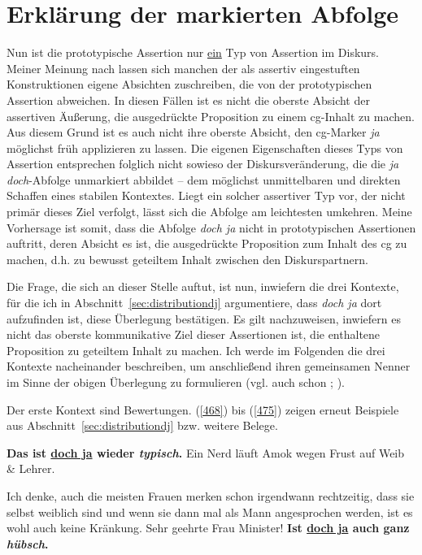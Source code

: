 \section{Erklärung der markierten Abfolge}
\label{sec:markiert} 
Nun ist die prototypische Assertion nur \underline{ein} Typ von Assertion im Diskurs. Meiner Meinung nach lassen sich manchen der als assertiv eingestuften Konstruktionen eigene Absichten zuschreiben, die von der prototypischen Assertion abweichen. In diesen Fällen ist es nicht die oberste Absicht der assertiven Äußerung, die ausgedrückte Proposition zu einem cg-Inhalt zu machen. Aus diesem Grund ist es auch nicht ihre oberste Absicht, den cg-Marker \textit{ja} möglichst früh applizieren zu lassen. Die eigenen Eigenschaften dieses Typs von Assertion entsprechen folg\-lich nicht sowieso der Diskursveränderung, die die \textit{ja doch}-Abfolge unmarkiert abbildet – dem möglichst unmittelbaren und direkten Schaffen eines stabilen Kontextes. Liegt ein solcher assertiver Typ vor, der nicht primär dieses Ziel verfolgt, lässt sich die Abfolge am leichtesten umkehren. Meine Vorhersage ist somit, dass die Abfolge \textit{doch ja} nicht in prototypischen Assertionen auftritt, deren Absicht es ist, die ausgedrückte Proposition zum Inhalt des cg zu machen, d.h. zu bewusst geteiltem Inhalt zwischen den Diskurspartnern.

Die Frage, die sich an dieser Stelle auftut, ist nun, inwiefern die drei Kontexte, für die ich in Abschnitt~\ref{sec:distributiondj} argumentiere, dass \textit{doch ja} dort aufzufinden ist, diese Überlegung bestätigen. Es gilt nachzuweisen, inwiefern es nicht das oberste kommunikative Ziel dieser Assertionen ist, die enthaltene Proposition zu geteiltem Inhalt zu machen. Ich werde im Folgenden die drei Kontexte nacheinander beschreiben, um anschließend ihren gemeinsamen Nenner im Sinne der obigen Überlegung zu formulieren (vgl. auch schon \citealt[200-204]{Mueller2014a}; \citealt[226-231]{Mueller2017b}). 

Der erste Kontext sind Bewertungen. (\ref{468}) bis (\ref{475}) zeigen erneut Beispiele aus Abschnitt~\ref{sec:distributiondj} bzw. weitere Belege.

\begin{exe}
	\ex\label{468} 
	\textbf{Das ist \underline{doch ja} wieder \textit{typisch}.} Ein \glqq Nerd\grqq{} läuft Amok wegen Frust auf Weib \& Lehrer. 
\end{exe}

\begin{exe}
	\ex\label{469} 
	\scriptsize
	Ich denke, auch die meisten Frauen merken schon irgendwann rechtzeitig, dass sie selbst weiblich sind und wenn sie dann mal als Mann angesprochen 			werden, ist es wohl auch keine Kränkung. \glqq Sehr geehrte Frau Minister!\grqq{} \textbf{Ist \underline{doch ja} auch ganz \textit{hübsch}.}		
\end{exe}	

